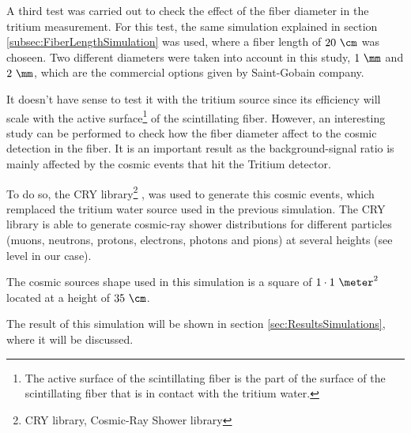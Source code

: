 A third test was carried out to check the effect of the fiber diameter in the tritium measurement. For this test, the same simulation explained in section \ref{subsec:FiberLengthSimulation} was used, where a fiber length of $20~\cm$ was choseen. Two different diameters were taken into account in this study, $1~\mm$ and $2~\mm$, which are the commercial options given by Saint-Gobain company.

It doesn't have sense to test it with the tritium source since its efficiency will scale with the active surface\footnote{The active surface of the scintillating fiber is the part of the surface of the scintillating fiber that is in contact with the tritium water.} of the scintillating fiber. However, an interesting study can be performed to check how the fiber diameter affect to the cosmic detection in the fiber. It is an important result as the background-signal ratio is mainly affected by the cosmic events that hit the Tritium detector.

To do so, the CRY library\footnote{CRY library, Cosmic-Ray Shower library} \cite{CRYwebsite}, \cite{CRYpaper} was used to generate this cosmic events, which remplaced the tritium water source used in the previous simulation. The CRY library is able to generate cosmic-ray shower distributions for different particles (muons, neutrons, protons, electrons, photons and pions) at several heights (see level in our case).

The cosmic sources shape used in this simulation is a square of $1\cdot 1~\meter ^2$ located at a height of $35~\cm$.

The result of this simulation will be shown in section \ref{sec:ResultsSimulations}, where it will be discussed.